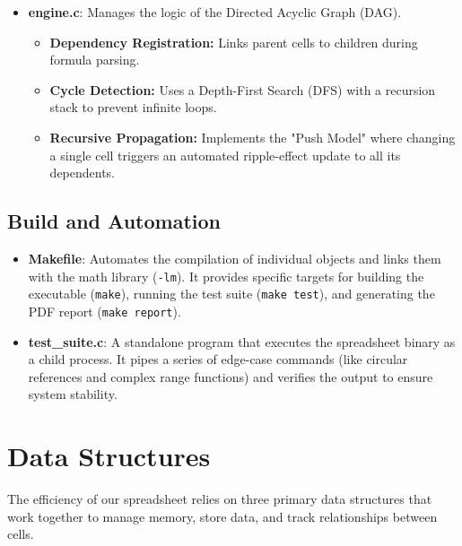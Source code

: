 \documentclass[twocolumn]{article}
\begin{document}
\begin{itemize}
    \item \textbf{engine.c}: 
    Manages the logic of the Directed Acyclic Graph (DAG).
    \begin{itemize}
        \item \textbf{Dependency Registration:} Links parent cells to children during formula parsing.
        \item \textbf{Cycle Detection:} Uses a Depth-First Search (DFS) with a recursion stack to prevent infinite loops.
        \item \textbf{Recursive Propagation:} Implements the "Push Model" where changing a single cell triggers an automated ripple-effect update to all its dependents.
    \end{itemize}
\end{itemize}

\subsection{Build and Automation}

\begin{itemize}
    \item \textbf{Makefile}: 
    Automates the compilation of individual objects and links them with the math library (\texttt{-lm}). It provides specific targets for building the executable (\texttt{make}), running the test suite (\texttt{make test}), and generating the PDF report (\texttt{make report}).
    
    \item \textbf{test\_suite.c}: 
    A standalone program that executes the spreadsheet binary as a child process. It pipes a series of edge-case commands (like circular references and complex range functions) and verifies the output to ensure system stability.
\end{itemize}


\section{Data Structures}

The efficiency of our spreadsheet relies on three primary data structures that work together to manage memory, store data, and track relationships between cells.
\end{document}
